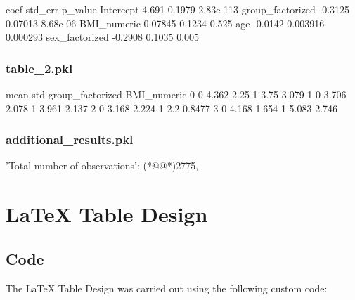 \documentclass[11pt]{article}
\begin{document}
\begin{codeoutput}
                    coef  std\_err    p\_value
Intercept          4.691   0.1979  2.83e-113
group\_factorized -0.3125  0.07013   8.68e-06
BMI\_numeric      0.07845   0.1234      0.525
age              -0.0142 0.003916   0.000293
sex\_factorized   -0.2908   0.1035      0.005
\end{codeoutput}\hypertarget{file-table-2-pkl}{}

\subsubsection*{\hyperlink{code-Data Analysis-table-2-pkl}{table\_2.pkl}}

\begin{codeoutput}
                              mean    std
group\_factorized BMI\_numeric             
0                0           4.362   2.25
                 1            3.75  3.079
1                0           3.706  2.078
                 1           3.961  2.137
2                0           3.168  2.224
                 1             2.2 0.8477
3                0           4.168  1.654
                 1           5.083  2.746
\end{codeoutput}\hypertarget{file-additional-results-pkl}{}

\subsubsection*{\hyperlink{code-Data Analysis-additional-results-pkl}{additional\_results.pkl}}

\begin{codeoutput}
{
    'Total number of observations': (*@@*)2775,
}
\end{codeoutput}

\section{LaTeX Table Design}
\subsection{{Code}}
The LaTeX Table Design was carried out using the following custom code:
\end{document}
